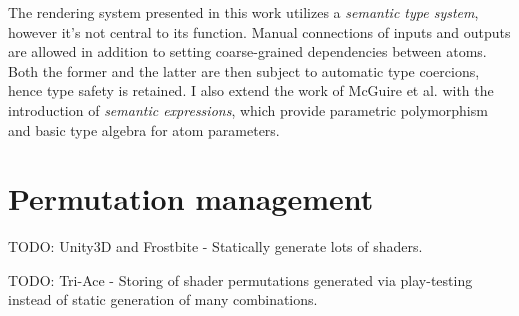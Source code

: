 
The rendering system presented in this work utilizes a \emph{semantic type system}, however it's not central to its function. Manual connections of inputs and outputs are allowed in addition to setting coarse-grained dependencies between atoms. Both the former and the latter are then subject to automatic type coercions, hence type safety is retained. I also extend the work of McGuire et al. with the introduction of \emph{semantic expressions}, which provide parametric polymorphism and basic type algebra for atom parameters.

\section{Permutation management}

TODO: Unity3D and Frostbite - Statically generate lots of shaders.

TODO: Tri-Ace - Storing of shader permutations generated via play-testing instead of static generation of many combinations.
